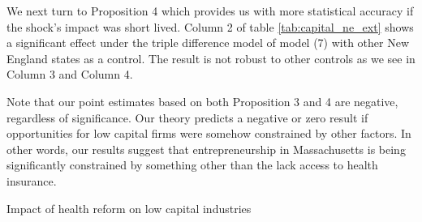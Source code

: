 \documentclass[12pt]{article}
\begin{document}
We next turn to Proposition 4 which provides us with more statistical accuracy if the shock's impact was short lived. Column 2 of table \ref{tab:capital_ne_ext} shows a significant effect under the triple difference model of model (7) with other New England states as a control. The result is not robust to other controls as we see in Column 3 and Column 4. 

Note that our point estimates based on both Proposition 3 and 4 are negative, regardless of significance. Our theory predicts a negative or zero result if opportunities for low capital firms were somehow constrained by other factors. In other words, our results suggest that entrepreneurship in Massachusetts is being significantly constrained by something other than the lack access to health insurance. 

\begin{table}[H]
	\centering
	\caption{Impact of health reform on low capital industries}
	
	\label{tab:capital_ne}
\end{table} 

\begin{comment}

\multicolumn{4}{l}{\footnotesize Column (1) is a diff-in-diff model of non-employers per million people in Massachusetts from  }\\ 
\multicolumn{4}{l}{\footnotesize \space 2000 to 2012 with treatment after 2007 and treatment intensity equal to percentage of non-profit}\\ 
\multicolumn{4}{l}{\footnotesize \space firms within industry.}\\ 
\multicolumn{4}{l}{\footnotesize Non-profit industries defined by 4 digit NAICS codes where over half of firms were tax-exempt }\\
\multicolumn{4}{l}{\footnotesize  \space according to 2007 Economic Census data.}\\
\multicolumn{4}{l}{\footnotesize Maine, Connecticut, Vermont, Rhode Island and New Hampshire used as controls in column (2) }\\
\multicolumn{4}{l}{\footnotesize \space under triple diff model. }\\
\multicolumn{4}{l}{\footnotesize Column (3) restricts the dataset to counties that border other states across Massachusetts, }\\
\multicolumn{4}{l}{\footnotesize \space Connecticut, Vermont, Rhode Island, New Hampshire and New York. }\\
\multicolumn{4}{l}{\footnotesize Column (4) uses a synthetic control model that matches each Massachuetts industry by county }\\
\multicolumn{4}{l}{\footnotesize \space pre-trend against US counties with similar income, age, urban and insurance rate characteristics. }\\

\begin{table}[H]
	\centering
	
	\caption{Impact of health reform on low capital industries}
\end{table}

\end{comment}
\end{document}
